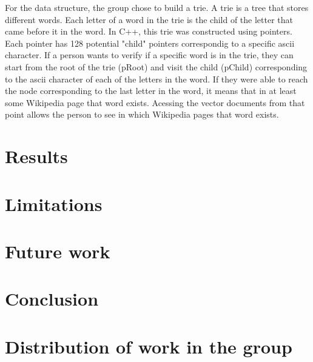 \documentclass{article}
\begin{document}
For the data structure, the group chose to build a trie. A trie is a tree that stores different words. Each letter of a word in the trie is the child of the letter that came before it in the word. In C++, this trie was constructed using pointers. Each pointer has 128 potential "child" pointers correspondig to a specific ascii character. If a person wants to verify if a specific word is in the trie, they can start from the root of the trie (pRoot) and visit the child (pChild) corresponding to the ascii character of each of the letters in the word. If they were able to reach the node corresponding to the last letter in the word, it means that in at least some Wikipedia page that word exists. Acessing the vector documents from that point allows the person to see in which Wikipedia pages that word exists.






\section*{Results}

\section*{Limitations}
\section*{Future work}
\section*{Conclusion}
\section*{Distribution of work in the group}
\end{document}
